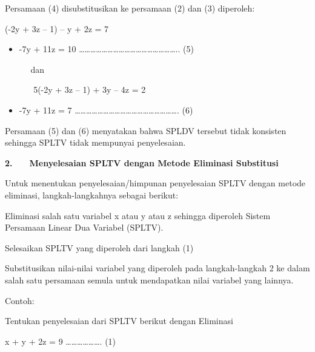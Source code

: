 \documentclass[11pt,fleqn]{book} %
\begin{document}
\begin{myEnumerate}
\begin{itemize}
		\hspace*{0.5in} Persamaan (4) disubstitusikan ke persamaan (2) dan (3) diperoleh: \par
		(-2y + 3z – 1) – y + 2z = 7 \par
		\noindent 
		\begin{itemize}
			\item -7y + 11z = 10 …………………………………………….. (5) \par
			\noindent 
			$  $ $  $ $  $ $  $ $  $dan \par
			\noindent 
			$  $ $  $ $  $ $  $ $  $ $  $5(-2y + 3z – 1) + 3y – 4z = 2 \par
			\noindent 
			\item -7y + 11z = 7 ………………………………………………. (6)\end{itemize}
		\par
		\noindent 
		Persamaan (5) dan (6) menyatakan bahwa SPLDV tersebut tidak konsisten sehingga SPLTV tidak mempunyai penyelesaian. \par
		\vspace{12pt}
		\textbf{2.} $  $ $  $ $  $ $  $ $  $ $  $\textbf{Menyelesaian SPLTV dengan Metode Eliminasi Substitusi} \par
		\noindent 
		Untuk menentukan penyelesaian/himpunan penyelesaian SPLTV dengan metode eliminasi, langkah-langkahnya sebagai berikut: \par
		\par
		\vspace{12pt}
		\noindent 
		Contoh: \par
		\noindent 
\end{itemize}
\end{myEnumerate}
\end{document}
